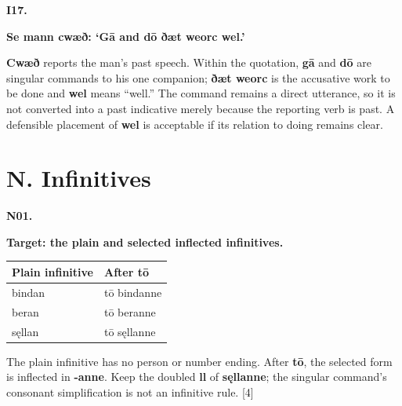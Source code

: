 \par\begin{minipage}{\linewidth}\raggedright
\textbf{I17.}

\textbf{Se mann cwæð: ‘Gā and dō ðæt weorc wel.’}

\textbf{Cwæð} reports the man’s past speech. Within the quotation, \textbf{gā} and \textbf{dō} are singular commands to his one companion; \textbf{ðæt weorc} is the accusative work to be done and \textbf{wel} means “well.” The command remains a direct utterance, so it is not converted into a past indicative merely because the reporting verb is past. A defensible placement of \textbf{wel} is acceptable if its relation to doing remains clear.

\end{minipage}\par\addvspace{4pt}

\section*{N. Infinitives}

\par\begin{minipage}{\linewidth}\raggedright
\textbf{N01.}

\textbf{Target: the plain and selected inflected infinitives.}

\par\begingroup
\fontsize{10.5}{13.2}\selectfont
\setlength{\LTleft}{0pt}\setlength{\LTright}{\fill}
\noindent
\begin{tabular}{@{}>{\raggedright\arraybackslash}p{67.8mm}>{\raggedright\arraybackslash}p{53.39mm}@{}}
\toprule
\textbf{Plain infinitive} & \textbf{After tō} \\
\midrule
bindan & tō bindanne \\
beran & tō beranne \\
sęllan & tō sęllanne \\
\bottomrule
\end{tabular}
\par\endgroup

The plain infinitive has no person or number ending. After \textbf{tō}, the selected form is inflected in \textbf{-anne}. Keep the doubled \textbf{ll} of \textbf{sęllanne}; the singular command’s consonant simplification is not an infinitive rule. [4]

\end{minipage}\par\addvspace{4pt}

